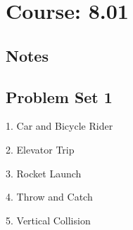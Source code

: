 \chapter{Course: 8.01}
\section{Notes}

\onecolumn
\section{Problem Set 1}

\begin{problem}{1. Car and Bicycle Rider}
\end{problem}
\begin{solution}
\end{solution}

\begin{problem}{2. Elevator Trip}
\end{problem}
\begin{solution}
\end{solution}

\begin{problem}{3. Rocket Launch}
\end{problem}
\begin{solution}
\end{solution}

\begin{problem}{4. Throw and Catch}
\end{problem}
\begin{solution}
\end{solution}

\begin{problem}{5. Vertical Collision}
\end{problem}
\begin{solution}
\end{solution}
\twocolumn